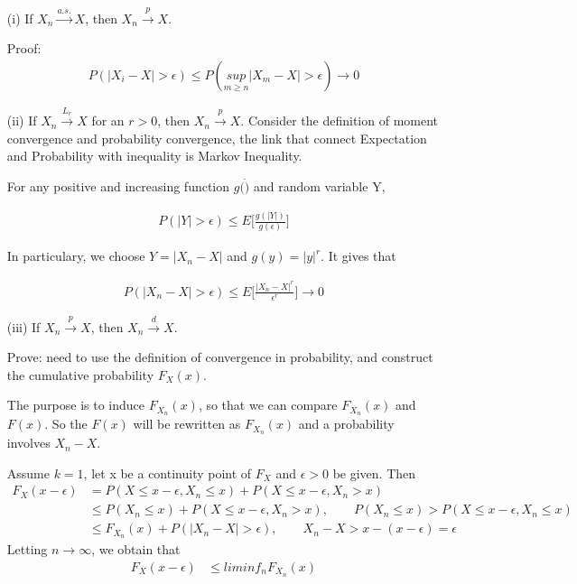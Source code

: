 \begin{itemize}
\item[(i)] If $X_n \xrightarrow {a.s.} X$, then $X_n \xrightarrow {p} X$. 

Proof: 
 \begin{align*}
   P(\Big | X_i - X \Big | > \epsilon) \leq P(\underset{m \geq n}{sup} \Big | X_m - X \Big | > \epsilon) \rightarrow 0
 \end{align*}
 
 
\item[(ii)] If $X_n \xrightarrow {L_r} X$ for an $r>0$, then $X_n \xrightarrow {p} X$. 
Consider the definition of moment convergence and probability convergence, the link that connect Expectation and Probability with inequality is Markov Inequality.

For any positive and increasing function $g(\dot)$ and random variable Y, 

 \begin{align*}
   P(\Big | Y \Big | > \epsilon) \leq E \Big[ \frac{g(|Y|)}{g(\epsilon)} \Big]
 \end{align*}

In particulary, we choose $Y= \Big | X_n -X \Big |$ and $g(y) = |y|^{r}$. It gives that

 \begin{align*}
   P(\Big | X_n - X \Big | > \epsilon) \leq E \Big[ \frac{\Big | X_n - X\Big |^r}{\epsilon^r} \Big] \rightarrow 0
 \end{align*}
 

\item[(iii)] If $X_n \xrightarrow {p} X$, then $X_n \xrightarrow {d} X$. 

Prove: need to use the definition of convergence in probability, and construct the cumulative probability $F_X(x)$.

The purpose is to induce $F_{X_n}(x)$, so that we can compare $F_{X_n}(x)$ and $F(x)$. So the $F(x)$ will be rewritten as $F_{X_n}(x)$ and a probability involves $X_n - X$.


Assume $k=1$, let x be a continuity point of $F_X$ and $\epsilon > 0$ be given. Then
 \begin{align*}
   F_X(x - \epsilon) &= P(X \leq x - \epsilon, X_n \leq x) +  P(X \leq x - \epsilon, X_n > x)  \\
   & \leq P(X_n \leq x) + P(X \leq x - \epsilon, X_n > x), \qquad  P(X_n \leq x) > P(X \leq x - \epsilon, X_n \leq x) \\
   & \leq F_{X_n}(x) + P(|X_n - X| > \epsilon), \qquad X_n - X > x - (x-\epsilon) = \epsilon 
 \end{align*}
Letting $n \rightarrow \infty$, we obtain that 
 \begin{align*}
   F_X(x - \epsilon) & \leq lim inf_{n} F_{X_n} (x) \\
 \end{align*}


\end{itemize}
